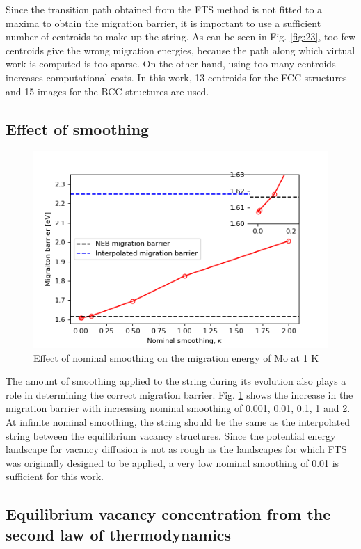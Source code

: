 \documentclass{article}
\begin{document}
Since the transition path obtained from the FTS method is not fitted to a maxima to obtain the migration barrier, it is important to use a sufficient number of centroids to make up the string. As can be seen in Fig. \ref{fig:23}, too few centroids give the wrong migration energies, because the path along which virtual work is computed is too sparse. On the other hand, using too many centroids increases computational costs. In this work, 13 centroids for the FCC structures and 15 images for the BCC structures are used.

\subsection{Effect of smoothing}\label{smooth}

\begin{figure}[!htp]
\centering
\includegraphics[scale=0.65]{smooth}
\caption{Effect of nominal smoothing on the migration energy of Mo at 1 K}
\label{fig:24}
\end{figure}

The amount of smoothing applied to the string during its evolution also plays a role in determining the correct migration barrier. Fig. \ref{fig:24} shows the increase in the migration barrier with increasing nominal smoothing of 0.001, 0.01, 0.1, 1 and 2. At infinite nominal smoothing, the string should be the same as the interpolated string between the equilibrium vacancy structures. Since the potential energy landscape for vacancy diffusion is not as rough as the landscapes for which FTS was originally designed to be applied, a very low nominal smoothing of 0.01 is sufficient for this work.

\subsection{Equilibrium vacancy concentration from the second law of thermodynamics}\label{2ndlaw}
\end{document}
